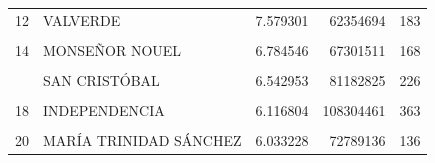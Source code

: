 \documentclass[10pt,landscape,a3paper]{article}
\begin{document}
\begin{table}[H]
\begin{tabular}[t]{llrrr}
12 & VALVERDE & 7.579301 & 62354694 & 183\\
\cellcolor{lightgray}{13} & \cellcolor{lightgray}{ELÍAS PIÑA} & \cellcolor{lightgray}{6.865931} & \cellcolor{lightgray}{95820932} & \cellcolor{lightgray}{659}\\
14 & MONSEÑOR NOUEL & 6.784546 & 67301511 & 168\\
\cellcolor{lightgray}{15} & \cellcolor{lightgray}{SAN JUAN} & \cellcolor{lightgray}{6.560149} & \cellcolor{lightgray}{220712371} & \cellcolor{lightgray}{1772}\\
\addlinespace
16 & SAN CRISTÓBAL & 6.542953 & 81182825 & 226\\
\cellcolor{lightgray}{17} & \cellcolor{lightgray}{SANTIAGO} & \cellcolor{lightgray}{6.289643} & \cellcolor{lightgray}{176542269} & \cellcolor{lightgray}{380}\\
18 & INDEPENDENCIA & 6.116804 & 108304461 & 363\\
\cellcolor{lightgray}{19} & \cellcolor{lightgray}{ESPAILLAT} & \cellcolor{lightgray}{6.052755} & \cellcolor{lightgray}{50958817} & \cellcolor{lightgray}{58}\\
20 & MARÍA TRINIDAD SÁNCHEZ & 6.033228 & 72789136 & 136\\
\bottomrule
\end{tabular}
\end{table}
\end{document}
